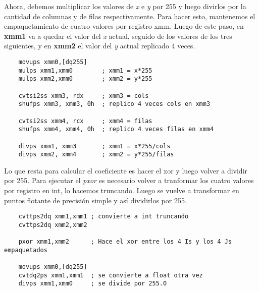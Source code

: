 \documentclass[a4paper]{article}
\begin{document}
\indent Ahora, debemos multiplicar los valores de \emph{x} e \emph{y} por 255 y luego divirlos por la cantidad de columnas y de filas respectivamente. Para hacer esto, mantenemos el empaquetamiento de cuatro valores por registro xmm. Luego de este paso, en \textbf{xmm1} va a quedar el valor del \emph{x} actual, seguido de los valores de los tres siguientes, y en \textbf{xmm2} el valor del \emph{y} actual replicado 4 veces.
 \begin{codesnippet}
\begin{verbatim}
    movups xmm0,[dq255]
    mulps xmm1,xmm0        ; xmm1 = x*255
    mulps xmm2,xmm0        ; xmm2 = y*255
    
    cvtsi2ss xmm3, rdx     ; xmm3 = cols  
    shufps xmm3, xmm3, 0h  ; replico 4 veces cols en xmm3

    cvtsi2ss xmm4, rcx     ; xmm4 = filas
    shufps xmm4, xmm4, 0h  ; replico 4 veces filas en xmm4

    divps xmm1, xmm3       ; xmm1 = x*255/cols
    divps xmm2, xmm4       ; xmm2 = y*255/filas
\end{verbatim}
\end{codesnippet}
\newpage

\indent Lo que resta para calcular el coeficiente es hacer el xor y luego volver a dividir por 255. Para ejecutar el \textit{pxor} es necesario volver a tranformar los cuatro valores por registro en int, lo hacemos truncando. Luego se vuelve a transformar en puntos flotante de precisi\'on simple y as\'i dividirlos por 255.
 \begin{codesnippet}
\begin{verbatim}
    cvttps2dq xmm1,xmm1 ; convierte a int truncando
    cvttps2dq xmm2,xmm2

    pxor xmm1,xmm2      ; Hace el xor entre los 4 Is y los 4 Js empaquetados

    movups xmm0,[dq255]
    cvtdq2ps xmm1,xmm1  ; se convierte a float otra vez
    divps xmm1,xmm0     ; se divide por 255.0 
\end{verbatim}
\end{codesnippet}
\end{document}
